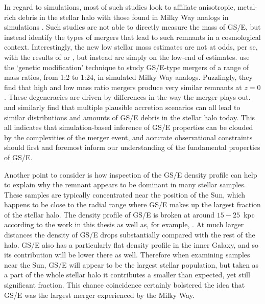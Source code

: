 In regard to simulations, most of such studies look to affiliate anisotropic, metal-rich debris in the stellar halo with those found in Milky Way analogs in simulations \parencite[e.g.][]{fattahi19,mackereth19a}. Such studies are not able to directly measure the mass of GS/E, but instead identify the types of mergers that lead to such remnants in a cosmological context. Interestingly, the new low stellar mass estimates are not at odds, per se, with the results of \textcite{fattahi19} or \textcite{mackereth19a}, but instead are simply on the low-end of estimates. \textcite{rey23} use the `genetic modification' technique \parencite{stopyra21,rey22} to study GS/E-type mergers of a range of mass ratios, from 1:2 to 1:24, in simulated Milky Way analogs. Puzzlingly, they find that high and low mass ratio mergers produce very similar remnants at $z=0$. These degeneracies are driven by differences in the way the merger plays out. \textcite{grand20} and \textcite{orkney22} similarly find that multiple plausible accretion scenarios can all lead to similar distributions and amounts of GS/E debris in the stellar halo today. This all indicates that simulation-based inference of GS/E properties can be clouded by the complexities of the merger event, and accurate observational constraints should first and foremost inform our understanding of the fundamental properties of GS/E.

Another point to consider is how inspection of the GS/E density profile can help to explain why the remnant appears to be dominant in many stellar samples. These samples are typically concentrated near the position of the Sun, which happens to be close to the radial range where GS/E makes up the largest fraction of the stellar halo. The density profile of GS/E is broken at around $15-25$~kpc according to the work in this thesis as well as, for example, \textcite{han23}. At much larger distances the density of GS/E drops substantially compared with the rest of the halo. GS/E also has a particularly flat density profile in the inner Galaxy, and so its contribution will be lower there as well. Therefore when examining samples near the Sun, GS/E will appear to be the largest stellar population, but taken as a part of the whole stellar halo it contributes a smaller than expected, yet still significant fraction. This chance coincidence certainly bolstered the idea that GS/E was the largest merger experienced by the Milky Way.

